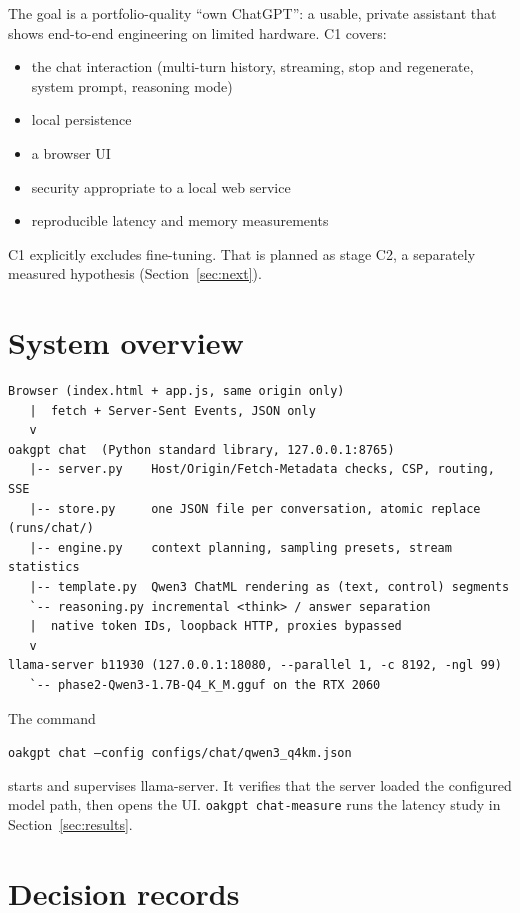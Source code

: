\documentclass[11pt,a4paper]{article}
\newcommand{\code}[1]{\texttt{#1}}
\begin{document}
The goal is a portfolio-quality ``own ChatGPT'': a usable, private assistant that shows
end-to-end engineering on limited hardware. C1 covers:
\begin{itemize}
  \item the chat interaction (multi-turn history, streaming, stop and regenerate, system
        prompt, reasoning mode)
  \item local persistence
  \item a browser UI
  \item security appropriate to a local web service
  \item reproducible latency and memory measurements
\end{itemize}
C1 explicitly excludes fine-tuning. That is planned as stage C2, a separately measured
hypothesis (Section~\ref{sec:next}).

\section{System overview}

\begin{Verbatim}[fontsize=\small,frame=single,framesep=3mm]
Browser (index.html + app.js, same origin only)
   |  fetch + Server-Sent Events, JSON only
   v
oakgpt chat  (Python standard library, 127.0.0.1:8765)
   |-- server.py    Host/Origin/Fetch-Metadata checks, CSP, routing, SSE
   |-- store.py     one JSON file per conversation, atomic replace (runs/chat/)
   |-- engine.py    context planning, sampling presets, stream statistics
   |-- template.py  Qwen3 ChatML rendering as (text, control) segments
   `-- reasoning.py incremental <think> / answer separation
   |  native token IDs, loopback HTTP, proxies bypassed
   v
llama-server b11930 (127.0.0.1:18080, --parallel 1, -c 8192, -ngl 99)
   `-- phase2-Qwen3-1.7B-Q4_K_M.gguf on the RTX 2060
\end{Verbatim}

The command
\begin{center}\code{oakgpt chat --config configs/chat/qwen3\_q4km.json}\end{center}
starts and supervises llama-server. It verifies that the server loaded the configured model path, then opens
the UI. \code{oakgpt chat-measure} runs the latency study in Section~\ref{sec:results}.

\section{Decision records}
\end{document}
